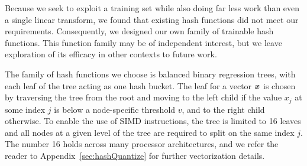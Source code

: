 Because we seek to exploit a training set while also doing far less work than even a single linear transform, we found that existing hash functions did not meet our requirements. Consequently, we designed our own family of trainable hash functions. This function family may be of independent interest, but we leave exploration of its efficacy in other contexts to future work. %

The family of hash functions we choose is balanced binary regression trees, with each leaf of the tree acting as one hash bucket. The leaf for a vector $\bm{x}$ is chosen by traversing the tree from the root and moving to the left child if the value $x_j$ at some index $j$ is below a node-specific threshold $v$, and to the right child otherwise. To enable the use of SIMD instructions, the tree is limited to 16 leaves and all nodes at a given level of the tree are required to split on the same index $j$. The number 16 holds across many processor architectures, and we refer the reader to Appendix~\ref{sec:hashQuantize} for further vectorization details.


